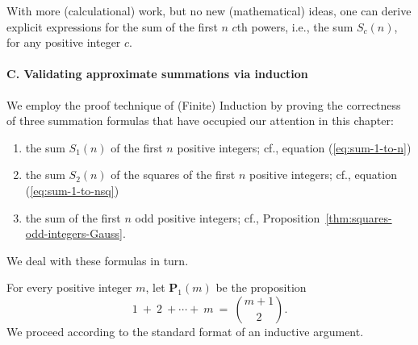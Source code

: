 \medskip

With more (calculational) work, but no new (mathematical) ideas, one
can derive explicit expressions for the sum of the first $n$ $c$th
powers, i.e., the sum $S_c(n)$, for any positive integer $c$.

\paragraph{\small\sf C. Validating approximate summations via induction} 

We employ the proof technique of (Finite) Induction by proving the
correctness of three summation formulas that have occupied our
attention in this chapter:
\begin{enumerate}
\item
the sum $S_1(n)$ of the first $n$ positive integers; cf., equation
(\ref{eq:sum-1-to-n})

\item
the sum $S_2(n)$ of the squares of the first $n$ positive integers;
cf., equation (\ref{eq:sum-1-to-nsq})

\item
the sum of the first $n$ odd positive integers; cf.,
Proposition~\ref{thm:squares-odd-integers-Gauss}.
\end{enumerate}
We deal with these formulas in turn.

%
For every positive integer $m$, let {\bf P}$_1(m)$ be the proposition
\[  1 \ + \ 2 \ +  \cdots  + \ m \ = \ {{m+1} \choose 2}. \]
We proceed according to the standard format of an inductive argument.

